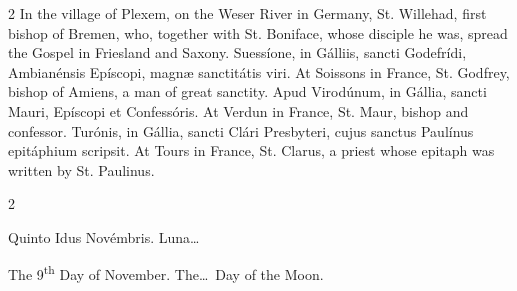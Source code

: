\begin{paracol}{2}
\switchcolumn
{}
In the village of Plexem, on the 
 Weser River in Germany, St. Willehad, first bishop of Bremen, who, together 
 with St. Boniface, whose disciple he was, spread the Gospel in Friesland and 
 Saxony.
\switchcolumn*
{}
Suessíone, in Gálliis, 
 sancti Godefrídi, Ambianénsis Epíscopi, magnæ sanctitátis viri.
\switchcolumn
{}
At Soissons in France, St. Godfrey, 
 bishop of Amiens, a man of great sanctity.
\switchcolumn*
{}
Apud Virodúnum, in 
 Gállia, sancti Mauri, Epíscopi et Confessóris.
\switchcolumn
{}
At Verdun in France, St. Maur, 
 bishop and confessor.
\switchcolumn*
{}
Turónis, in Gállia, 
 sancti Clári Presbyteri, cujus sanctus Paulínus epitáphium scripsit.
\switchcolumn
{}
At Tours in France, St. Clarus, a 
 priest whose epitaph was written by St. Paulinus.
\switchcolumn*
{}
\end{paracol}


\begin{paracol}{2}
\begin{center}{\color{gregoriocolor} Quinto Idus Novémbris. 
 Luna\dots\ }\end{center}
\switchcolumn
{}
\begin{center}{\color{gregoriocolor} The 9\textsuperscript{th} Day of 
 November. The\dots\ Day of the Moon.}\end{center}
\end{paracol}

